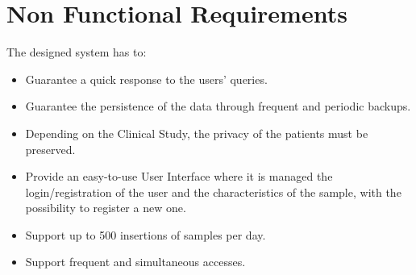 \section{Non Functional Requirements}
The designed system has to:
\begin{itemize}
    \item Guarantee a quick response to the users' queries.
    \item Guarantee the persistence of the data through frequent and periodic backups.
    \item Depending on the Clinical Study, the privacy of the patients must be preserved.
    \item Provide an easy-to-use User Interface where it is managed the login/registration of the user and the characteristics of the sample, with the possibility to register a new one.
    \item Support up to 500 insertions of samples per day.
    \item Support frequent and simultaneous accesses.
\end{itemize}
